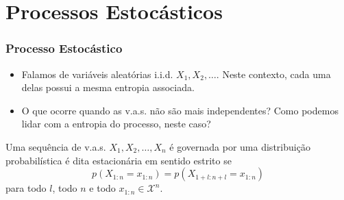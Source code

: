 \section{Processos Estocásticos}

\begin{frame}[allowframebreaks]
  \frametitle{Processo Estocástico}
  \begin{itemize}
  \item Falamos de variáveis aleatórias i.i.d. $X_1,X_2, \ldots$. Neste contexto, cada uma delas possui a mesma entropia associada.
  \item O que ocorre quando as v.a.s. não são mais independentes? Como podemos lidar com a entropia do processo, neste caso?
  \end{itemize}

  \begin{definition}
  Uma sequência de v.a.s. $X_1, X_2, \ldots, X_n$ é governada por uma distribuição probabilística é dita
  estacionária em sentido estrito se
	\begin{equation}
	p(X_{1:n} = x_{1:n}) = p(X_{1+l:n+l} = x_{1:n})
	\end{equation}  
  para todo $l$, todo $n$ e todo $x_{1:n} \in \mathcal{X}^n$.
  \end{definition}
\end{frame}

